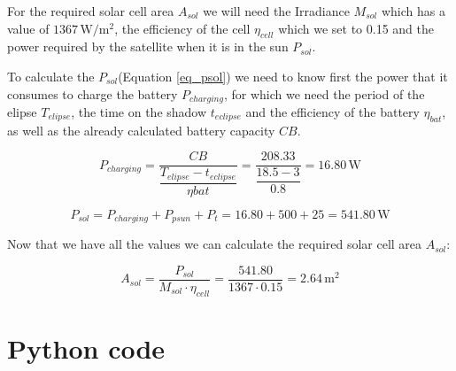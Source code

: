 \documentclass[a4paper,12pt,calibri,oneside,openany]{book}
\newcommand{\unit}[1]{\ensuremath{\, \mathrm{#1}}}
\theoremstyle{break}
\begin{document}
		For the required solar cell area $A_{sol}$ we will need the Irradiance $M_{sol}$ which has a value of $1367 \unit{W/m^{2}}$, the efficiency of the cell $\eta_{cell}$ which we set to 0.15 and the power required by the satellite when it is in the sun $P_{sol}$.
		
		To calculate the $P_{sol}$(Equation \ref{eq_psol}) we need to know first the power that it consumes to charge the battery $P_{charging}$, for which we need the period of the elipse $T_{elipse}$, the time on the shadow $t_{eclipse}$ and the efficiency of the battery $\eta_{bat}$, as well as the already calculated battery capacity $CB$.
		
		\begin{equation} \label{eq_pcharging}
			P_{charging} = \dfrac{CB}{\dfrac{T_{elipse}-t_{eclipse}} {\eta{bat}}	} =
			\dfrac{208.33}{\dfrac{18.5-3}{0.8}	} = 16.80 \unit{W}
		\end{equation}
		
		\begin{equation} \label{eq_psol}
			P_{sol} = P_{charging} + P_{psun} + P_{t}= 
			16.80 + 500 + 25= 541.80 \unit{W}
		\end{equation}
		
		Now that we have all the values we can calculate the required solar cell area $A_{sol}$:
		
		\begin{equation} \label{eq_asol}
			A_{sol} = \dfrac{P_{sol}}{M_{sol} \cdot \eta_{cell}}= \dfrac{541.80}{1367 \cdot 0.15}=  2.64 \unit{m^{2}}
		\end{equation}
		
	
	







	




%
\listoffigures

%

\appendix
{}
\chapter{Python code}
\end{document}
